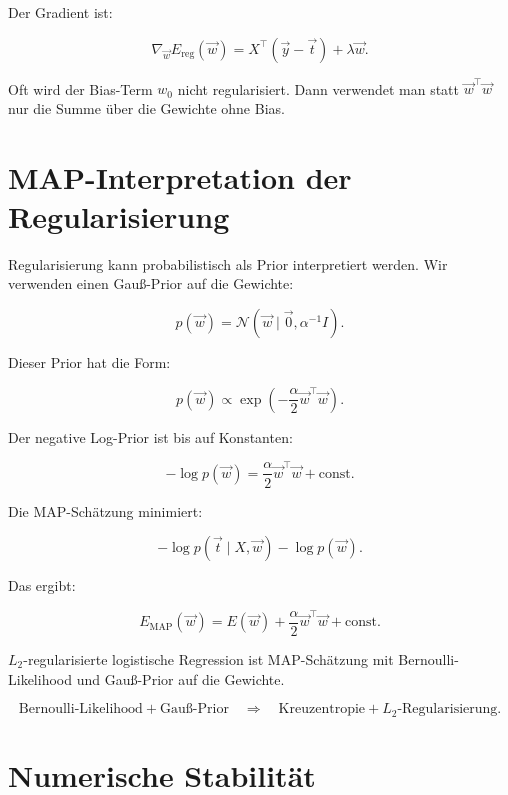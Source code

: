 Der Gradient ist:

\[
    \nabla_{\vec{w}}E_{\mathrm{reg}}(\vec{w})
    =
    X^{\top}(\vec{y}-\vec{t})
    +
    \lambda\vec{w}.
\]

\begin{notebox}
Oft wird der Bias-Term \(w_0\) nicht regularisiert.
Dann verwendet man statt \(\vec{w}^{\top}\vec{w}\) nur die Summe über die Gewichte ohne Bias.
\end{notebox}

\section{MAP-Interpretation der Regularisierung}

Regularisierung kann probabilistisch als Prior interpretiert werden.
Wir verwenden einen Gauß-Prior auf die Gewichte:

\[
    p(\vec{w})
    =
    \mathcal{N}
    \left(
        \vec{w}
        \mid
        \vec{0},
        \alpha^{-1}I
    \right).
\]

Dieser Prior hat die Form:

\[
    p(\vec{w})
    \propto
    \exp
    \left(
        -\frac{\alpha}{2}
        \vec{w}^{\top}\vec{w}
    \right).
\]

Der negative Log-Prior ist bis auf Konstanten:

\[
    -\log p(\vec{w})
    =
    \frac{\alpha}{2}
    \vec{w}^{\top}\vec{w}
    +
    \text{const}.
\]

Die MAP-Schätzung minimiert:

\[
    -\log p(\vec{t}\mid X,\vec{w})
    -
    \log p(\vec{w}).
\]

Das ergibt:

\[
    E_{\mathrm{MAP}}(\vec{w})
    =
    E(\vec{w})
    +
    \frac{\alpha}{2}
    \vec{w}^{\top}\vec{w}
    +
    \text{const}.
\]

\begin{conceptbox}
\(L_2\)-regularisierte logistische Regression ist MAP-Schätzung mit Bernoulli-Likelihood und Gauß-Prior auf die Gewichte.

\[
    \text{Bernoulli-Likelihood}
    +
    \text{Gauß-Prior}
    \quad
    \Longrightarrow
    \quad
    \text{Kreuzentropie}
    +
    L_2\text{-Regularisierung}.
\]
\end{conceptbox}

\section{Numerische Stabilität}

